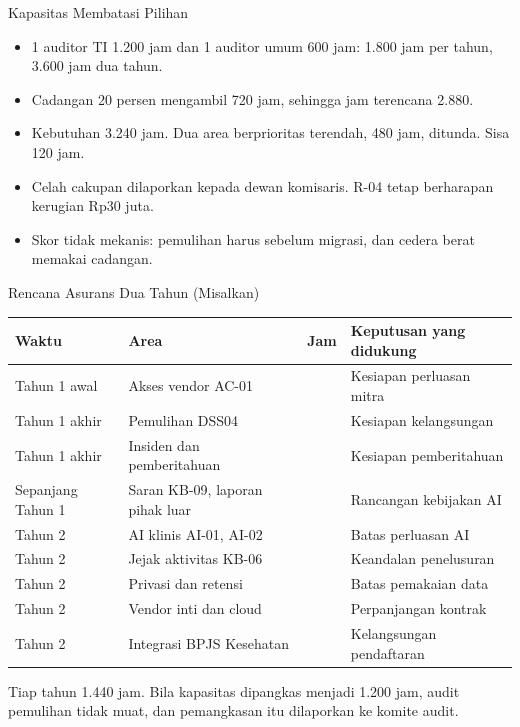 \documentclass[aspectratio=169, table, 12pt]{beamer}
\begin{document}
\begin{frame}{{\Large Kapasitas Membatasi Pilihan}}
  \vspace{6pt}
  \small
  \begin{itemize}
    \item 1 auditor TI 1.200 jam dan 1 auditor umum 600 jam: 1.800 jam per tahun, 3.600 jam dua
          tahun.
    \item Cadangan 20 persen mengambil 720 jam, sehingga jam terencana 2.880.
    \item Kebutuhan 3.240 jam. Dua area berprioritas terendah, 480 jam, ditunda. Sisa 120 jam.
    \item Celah cakupan dilaporkan kepada dewan komisaris. R-04 tetap berharapan kerugian Rp30 juta.
    \item Skor tidak mekanis: pemulihan harus sebelum migrasi, dan cedera berat memakai cadangan.
  \end{itemize}
\end{frame}

\begin{frame}{{\Large Rencana Asurans Dua Tahun (Misalkan)}}
  \vspace{0pt}
  \scriptsize
  \begin{tabularx}{\textwidth}{|>{\raggedright\arraybackslash}p{}|>{\raggedright\arraybackslash}X|>{\raggedright\arraybackslash}p{}|>{\raggedright\arraybackslash}X|}
    \hline
    \textbf{Waktu} & \textbf{Area} & \textbf{Jam} & \textbf{Keputusan yang didukung} \\ \hline
    Tahun 1 awal & Akses vendor AC-01 & 600 & Kesiapan perluasan mitra \\ \hline
    Tahun 1 akhir & Pemulihan DSS04 & 480 & Kesiapan kelangsungan \\ \hline
    Tahun 1 akhir & Insiden dan pemberitahuan & 240 & Kesiapan pemberitahuan \\ \hline
    Sepanjang Tahun 1 & Saran KB-09, laporan pihak luar & 120 & Rancangan kebijakan AI \\ \hline
    Tahun 2 & AI klinis AI-01, AI-02 & 480 & Batas perluasan AI \\ \hline
    Tahun 2 & Jejak aktivitas KB-06 & 240 & Keandalan penelusuran \\ \hline
    Tahun 2 & Privasi dan retensi & 200 & Batas pemakaian data \\ \hline
    Tahun 2 & Vendor inti dan cloud & 320 & Perpanjangan kontrak \\ \hline
    Tahun 2 & Integrasi BPJS Kesehatan & 200 & Kelangsungan pendaftaran \\ \hline
  \end{tabularx}

  \vspace{4pt}
  \scriptsize Tiap tahun 1.440 jam. Bila kapasitas dipangkas menjadi 1.200 jam, audit pemulihan
  tidak muat, dan pemangkasan itu dilaporkan ke komite audit.
\end{frame}
\end{document}
